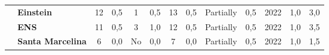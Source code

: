 \begin{table}[!htb]
\begin{tabular}{c|p{2cm}|cc|cc|cc|cc|cc|c}
    \rowcolor[rgb]{0.898,0.898,0.898} {\cellcolor[rgb]{0.753,0.753,0.753}}          & {\cellcolor[rgb]{0.753,0.753,0.753}}\textbf{Einstein}                                              & 12                                                                        & 0,5                                                                       & 1                                                                         & 0,5                                                                      & 13                                                       & 0,5                                               & Partially                                          & 0,5                                               & 2022                                               & 1,0                                                                                                                                                 & 3,0 \\
    {\cellcolor[rgb]{0.753,0.753,0.753}}                                            & {\cellcolor[rgb]{0.753,0.753,0.753}}\textbf{ENS}                                                   & 11                                                                        & 0,5                                                                       & 3                                                                         & 1,0                                                                      & 12                                                       & 0,5                                               & Partially                                          & 0,5                                               & 2022                                               & 1,0                                                                                                                                                 & 3,5 \\
    \rowcolor[rgb]{0.898,0.898,0.898} {\cellcolor[rgb]{0.753,0.753,0.753}}          & {\cellcolor[rgb]{0.753,0.753,0.753}}\textbf{Santa Marcelina}                                       & 6                                                                         & 0,0                                                                       & No                                                                        & 0,0                                                                      & 7                                                        & 0,0                                               & Partially                                          & 0,5                                               & 2022                                               & 1,0                                                                                                                                                 & 1,5 \\

\end{tabular}
\end{table}
